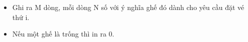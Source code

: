 \begin{itemize}
	\item     Ghi ra M dòng, mỗi dòng N số với ý nghĩa ghế đó dành cho yêu cầu đặt vé thứ i.   
	\item     Nếu một ghế là trống thì in ra 0.   
\end{itemize}
